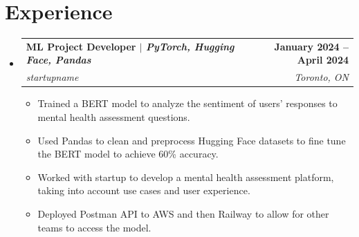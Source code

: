 \documentclass[letterpaper,11pt]{article}
\makeatletter
\newcommand{\resumeItem}[1]{
  \item\small{
    {#1 \vspace{-2pt}}
  }
}
\newcommand{\resumeSubheading}[4]{
  \vspace{-2pt}\item
    \begin{tabular*}{1.0\textwidth}[t]{l@{\extracolsep{\fill}}r}
      \textbf{#1} & \textbf{\small #2} \\
      \textit{\small#3} & \textit{\small #4} \\
    \end{tabular*}\vspace{-7pt}
}
\newcommand{\resumeSubHeadingListStart}{\begin{itemize}[leftmargin=0.0in, label={}]}
\newcommand{\resumeSubHeadingListEnd}{\end{itemize}}
\newcommand{\resumeItemListStart}{\begin{itemize}}
\newcommand{\resumeItemListEnd}{\end{itemize}\vspace{-5pt}}
\makeatother
\begin{document}
%
\section{Experience}
  \resumeSubHeadingListStart
    \resumeSubheading
    {\textbf{ML Project Developer} $|$ \emph{PyTorch, Hugging Face, Pandas}}{January 2024 -- April 2024}
      {startupname}{Toronto, ON}
      \resumeItemListStart
      \resumeItem{Trained a BERT model to analyze the sentiment of users' responses to mental health assessment questions.}
      \resumeItem{Used Pandas to clean and preprocess Hugging Face datasets to fine tune the BERT model to achieve 60\% accuracy.}
      \resumeItem{Worked with startup to develop a mental health assessment platform, taking into account use cases and user experience.}
      \resumeItem{Deployed Postman API to AWS and then Railway to allow for other teams to access the model.}        \resumeItemListEnd
  \resumeSubHeadingListEnd
\vspace{-20pt}

\end{document}
